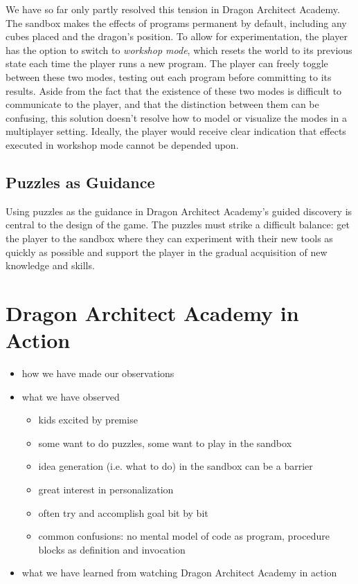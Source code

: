 \documentclass{sig-alternate}
\newcommand{\gametitle}{{\color{RoyalPurple} Dragon Architect Academy}}
\begin{document}
We have so far only partly resolved this tension in \gametitle{}. 
The sandbox makes the effects of programs permanent by default, including any cubes placed and the dragon's position.
To allow for experimentation, the player has the option to switch to \emph{workshop mode}, which resets the world to its previous state each time the player runs a new program. 
The player can freely toggle between these two modes, testing out each program before committing to its results. 
Aside from the fact that the existence of these two modes is difficult to communicate to the player, and that the distinction between them can be confusing, this solution doesn't resolve how to model or visualize the modes in a multiplayer setting. 
Ideally, the player would receive clear indication that effects executed in workshop mode cannot be depended upon.

\subsection{Puzzles as Guidance}
Using puzzles as the guidance in \gametitle{}'s guided discovery is central to the design of the game. 
The puzzles must strike a difficult balance: get the player to the sandbox where they can experiment with their new tools as quickly as possible and support the player in the gradual acquisition of new knowledge and skills. 


\section{\gametitle{} in Action}
\label{sec:action}
\begin{itemize}
\item how we have made our observations
\item what we have observed
\begin{itemize}
\item kids excited by premise
\item some want to do puzzles, some want to play in the sandbox
\item idea generation (i.e. what to do) in the sandbox can be a barrier
\item great interest in personalization
\item often try and accomplish goal bit by bit
\item common confusions: no mental model of code as program, procedure blocks as definition and invocation
\end{itemize}

\item what we have learned from watching \gametitle{} in action
\end{itemize}
\end{document}
